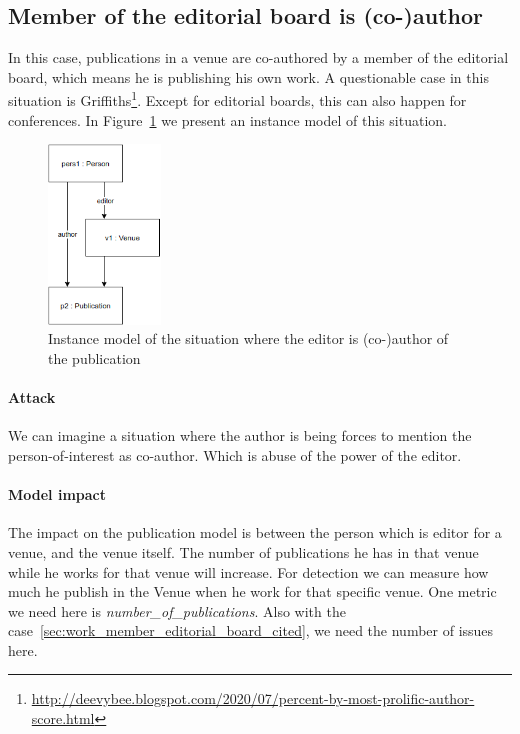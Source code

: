 \documentclass{ou-report}
\begin{document}
\subsection{Member of the editorial board is (co-)author}
In this case, publications in a venue are co-authored by a member of the 
editorial board, which means he is publishing his own work. A questionable case
in this situation is Griffiths\footnote{\url{http://deevybee.blogspot.com/2020/07/percent-by-most-prolific-author-score.html}}.
Except for editorial boards, this can also happen for conferences.
In Figure~\ref{fig:eia} we present an instance model of this situation.
\begin{figure}[H]
\centering
\includegraphics[width=3cm]{images/editor_is_author.drawio.png}
\caption{Instance model of the situation where the editor is (co-)author of the publication}
\label{fig:eia}
\end{figure}


\paragraph{Attack}
We can imagine a situation where the author is being forces to mention the 
person-of-interest as co-author. Which is abuse of the power of the editor.

\paragraph{Model impact}
The impact on the publication model is between the person which is editor for a 
venue, and the venue itself. 
The number of publications he has in that venue while he works for that venue 
will increase. For detection we can measure how much he publish in the Venue 
when he work for that specific venue.
One metric we need here is \textit{number\_of\_publications}. Also with the case~\ref{sec:work_member_editorial_board_cited}, we need the number of issues 
here.

\end{document}
